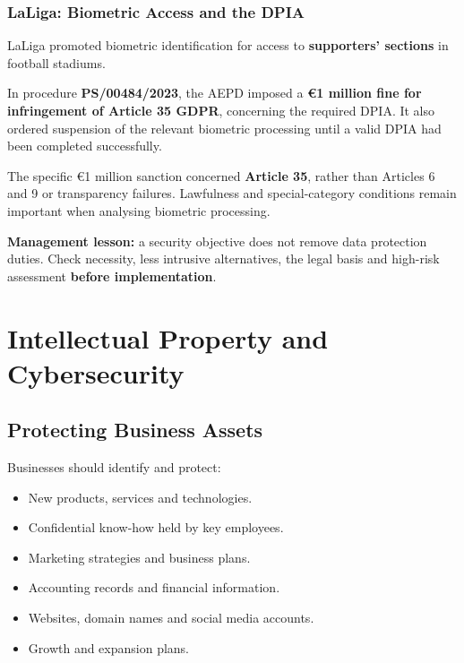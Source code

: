 \documentclass[12pt,a4paper]{report}
\newcommand{\tightlist}{}
\begin{document}
\hypertarget{laliga-biometric-access-and-the-dpia}{%
\subsection{LaLiga: Biometric Access and the DPIA}\label{laliga-biometric-access-and-the-dpia}}

LaLiga promoted biometric identification for access to \textbf{supporters' sections} in football stadiums.

In procedure \textbf{PS/00484/2023}, the AEPD imposed a \textbf{€1 million fine for infringement of Article 35 GDPR}, concerning the required DPIA. It also ordered suspension of the relevant biometric processing until a valid DPIA had been completed successfully.

The specific €1 million sanction concerned \textbf{Article 35}, rather than Articles 6 and 9 or transparency failures. Lawfulness and special-category conditions remain important when analysing biometric processing.

\textbf{Management lesson:} a security objective does not remove data protection duties. Check necessity, less intrusive alternatives, the legal basis and high-risk assessment \textbf{before implementation}.

\hypertarget{november-2026-intellectual-property-and-cybersecurity}{%
\chapter{ Intellectual Property and Cybersecurity}\label{november-2026-intellectual-property-and-cybersecurity}}

\hypertarget{protecting-business-assets}{%
\section{Protecting Business Assets}\label{protecting-business-assets}}

Businesses should identify and protect:

\begin{itemize}
\tightlist
\item
  New products, services and technologies.
\item
  Confidential know-how held by key employees.
\item
  Marketing strategies and business plans.
\item
  Accounting records and financial information.
\item
  Websites, domain names and social media accounts.
\item
  Growth and expansion plans.
\end{itemize}
\end{document}
